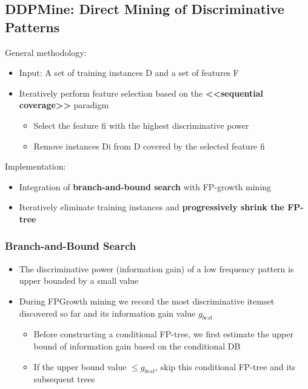 \subsection{DDPMine: Direct Mining of Discriminative Patterns}
General methodology:
\begin{itemize}
\item Input: A set of training instances D and a set of features F
\item Iteratively perform feature selection based on the \textbf{<<sequential coverage>>} paradigm
\begin{itemize}
\item Select the feature fi with the highest discriminative power
\item Remove instances Di from D covered by the selected feature fi
\end{itemize}
\end{itemize}

Implementation:
\begin{itemize}
\item Integration of \textbf{branch-and-bound search} with FP-growth mining
\item Iteratively eliminate training instances and \textbf{progressively shrink the FP-tree}
\end{itemize}

\subsubsection{Branch-and-Bound Search}
\begin{itemize}
\item The discriminative power (information gain) of a low frequency pattern is upper bounded by a small value
\item During FPGrowth mining we record the most discriminative itemset discovered so far and its information gain value $g_{best}$
\begin{itemize}
\item Before constructing a conditional FP-tree, we first estimate the upper bound of information gain based on the conditional DB
\item If the upper bound value $\leqslant g_{best}$, skip this conditional FP-tree and its subsequent trees
\end{itemize}
\end{itemize}



